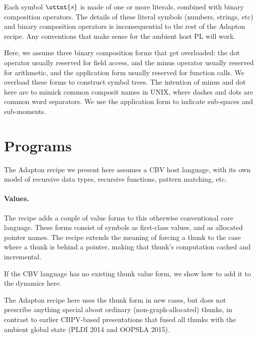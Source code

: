 \documentclass[11pt]{article}
\begin{document}
\ottgrammartabular{
  \otts
  \\
  \ottSpace
  \\
  \ottMoment
  \\
  \ottp
  \\
  \ottpp
  \\
  \ottd
}

Each symbol $\ottnt{s}$ is made of one or more literals,
combined with binary composition operators.
%
The details of these literal symbols (numbers, strings, etc) and
binary composition operators is inconsequential to the rest of the
Adapton recipe.  Any conventions that make sense for the ambient host PL will work.

Here, we assume three binary composition forms that get overloaded: the
dot operator usually reserved for field access, and the minus operator
usually reserved for arithmetic, and the application form usually reserved for function calls.
%
We overload these forms to construct symbol trees.
%
The intention of minus and dot here are to mimick common composit
names in UNIX, where dashes and dots are common word separators.
%
We use the application form to indicate sub-spaces and sub-moments.



\section{Programs}

The Adapton recipe we present here assumes a CBV host language, with
its own model of recursive data types, recursive functions, pattern
matching, etc.

\paragraph{Values.}

The recipe adds a couple of value forms to this otherwise conventional core language.
%
These forms consist of symbols as first-class values, and as allocated
pointer names.
%
The recipe extends the meaning of forcing a thunk to the case where a
thunk is behind a pointer, making that thunk's computation cached and
incremental.

\ottgrammartabular{
  \ottv
}


If the CBV language has no existing thunk value form, we show how to
add it to the dynamics here.

The Adapton recipe here uses the thunk form in new cases, but does not
prescribe anything special about ordinary (non-graph-allocated)
thunks, in contrast to earlier CBPV-based presentations that fused all
thunks with the ambient global state (PLDI 2014 and OOPSLA 2015).
\end{document}
